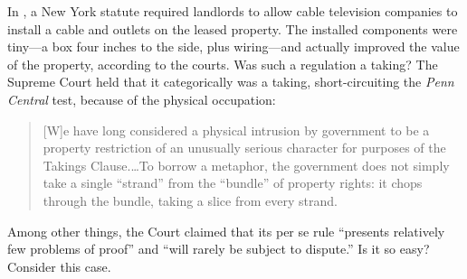 

In \optclause, a New York statute required landlords to allow
cable television companies to install a cable and outlets on the leased
property. The installed components were tiny---a box four inches to the side,
plus wiring---and actually improved the value of the property, according to the
courts. Was such a regulation a taking? The Supreme Court held that it
categorically was a taking, short-circuiting the \emph{Penn Central} test,
because of the physical occupation:
\begin{quote}
[W]e have long considered a physical intrusion by government to be a property
restriction of an unusually serious character for purposes of the Takings
Clause.\ldots To borrow a metaphor, the government does not simply take a single
``strand'' from the ``bundle'' of property rights: it chops through the bundle,
taking a slice from every strand.
\end{quote}
Among other things, the Court claimed that its per se rule ``presents relatively
few problems of proof'' and ``will rarely be subject to dispute.'' Is it so
easy? Consider this case.


